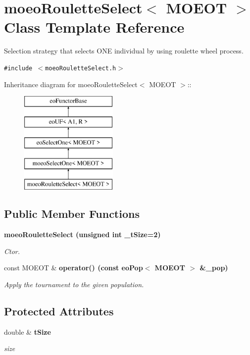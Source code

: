 \section{moeo\-Roulette\-Select$<$ MOEOT $>$ Class Template Reference}
\label{classmoeoRouletteSelect}
Selection strategy that selects ONE individual by using roulette wheel process.  


{\tt \#include $<$moeo\-Roulette\-Select.h$>$}

Inheritance diagram for moeo\-Roulette\-Select$<$ MOEOT $>$::\begin{figure}[H]
\begin{center}
\leavevmode
\includegraphics[height=5cm]{classmoeoRouletteSelect}
\end{center}
\end{figure}
\subsection*{Public Member Functions}
\begin{CompactItemize}
\item 
\bf{moeo\-Roulette\-Select} (unsigned int \_\-t\-Size=2)
\begin{CompactList}\small\item\em Ctor. \item\end{CompactList}\item 
const MOEOT \& \bf{operator()} (const \bf{eo\-Pop}$<$ MOEOT $>$ \&\_\-pop)
\begin{CompactList}\small\item\em Apply the tournament to the given population. \item\end{CompactList}\end{CompactItemize}
\subsection*{Protected Attributes}
\begin{CompactItemize}
\item 
double \& \bf{t\-Size}\label{classmoeoRouletteSelect_19af84fe966381cbfbe032f69ee0b42b}

\begin{CompactList}\small\item\em size \item\end{CompactList}\end{CompactItemize}


